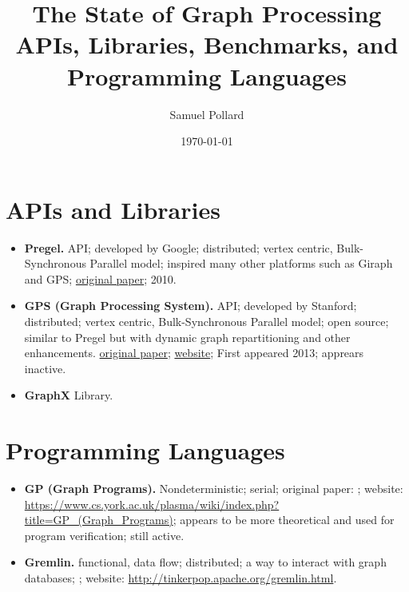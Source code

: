 \documentclass[11pt]{article}
\begin{document}
\title{The State of Graph Processing \\ \large APIs, Libraries, Benchmarks, and Programming Languages \vspace{-1em}}
\author{Samuel Pollard}
\date{\today}
\maketitle

\section{APIs and Libraries}
\begin{itemize}
	\item \textbf{Pregel.} API; developed by Google; distributed; vertex centric, Bulk-Synchronous Parallel model; inspired many other platforms such as Giraph and GPS; \href{http://dl.acm.org/citation.cfm?id=1807184}{original paper}; 2010.

	\item \textbf{GPS (Graph Processing System).} API; developed by Stanford; distributed; vertex centric, Bulk-Synchronous Parallel model; open source; similar to Pregel but with dynamic graph repartitioning and other enhancements. \href{http://ilpubs.stanford.edu:8090/1039/7/gps_ssdbm.pdf}{original paper}; \href{http://infolab.stanford.edu/gps/}{website}; First appeared 2013; apprears inactive.

	\item \textbf{GraphX} Library.
	
\end{itemize}

\section{Programming Languages}
\begin{itemize}
	\item \textbf{GP (Graph Programs).} Nondeterministic; serial; original paper: \cite{Plump:2009:GPL}; website: \url{https://www.cs.york.ac.uk/plasma/wiki/index.php?title=GP_(Graph_Programs)}; appears to be more theoretical and used for program verification; still active.

	\item \textbf{Gremlin.} functional, data flow; distributed; a way to interact with graph databases; \cite{Rodriguez:2015:Gremlin}; website: \url{http://tinkerpop.apache.org/gremlin.html}.
\end{itemize}
\end{document}
